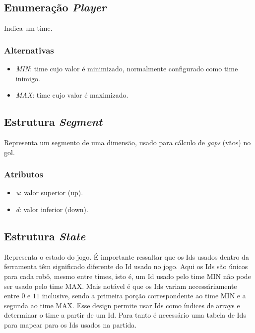\subsection*{Enumeração \textit{Player}}

Indica um time.

\subsubsection*{Alternativas}

\begin{itemize}
  \item \textit{MIN}: time cujo valor é minimizado, normalmente configurado como
    time inimigo.
  \item \textit{MAX}: time cujo valor é maximizado.
\end{itemize}

\subsection*{Estrutura \textit{Segment}}

Representa um segmento de uma dimensão, usado para cálculo de \textit{gaps}
(vãos) no gol.

\subsubsection*{Atributos}

\begin{itemize}
  \item \textit{u}: valor superior (up).
  \item \textit{d}: valor inferior (down).
\end{itemize}

\subsection*{Estrutura \textit{State}}

Representa o estado do jogo.  É importante ressaltar que os Ids usados dentro da
ferramenta têm significado diferente do Id usado no jogo.  Aqui os Ids são
únicos para cada robô, mesmo entre times, isto é, um Id usado pelo time MIN não
pode ser usado pelo time MAX.  Mais notável é que os Ids variam necessáriamente
entre $0$ e $11$ inclusive, sendo a primeira porção correspondente ao time MIN e
a segunda ao time MAX.  Esse design permite usar Ids como índices de arrays e
determinar o time a partir de um Id.  Para tanto é necessário uma tabela de Ids
para mapear para os Ids usados na partida.

